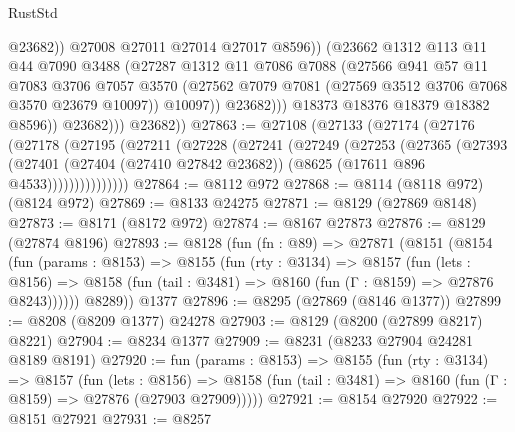 \begin{lexlean}{RustStd}
\begin{coremodule}
                              @23682))
                          @27008
                          @27011
                          @27014
                          @27017
                          @8596))
                      (@23662
                        @1312
                        @113
                        @11
                        @44
                        @7090
                        @3488
                        (@27287
                          @1312
                          @11
                          @7086
                          @7088
                          (@27566
                            @941
                            @57
                            @11
                            @7083
                            @3706
                            @7057
                            @3570
                            (@27562 @7079 @7081 (@27569 @3512 @3706 @7068 @3570 @23679 @10097))
                            @10097))
                        @23682)))
                  @18373
                  @18376
                  @18379
                  @18382
                  @8596))
              @23682)))
        @23682))
@27863 := @27108
    (@27133
      (@27174
        (@27176
          (@27178
            (@27195
              (@27211
                (@27228
                  (@27241
                    (@27249
                      (@27253
                        (@27365
                          (@27393
                            (@27401
                              (@27404 (@27410 @27842 @23682))
                              (@8625 (@17611 @896 @4533)))))))))))))))
@27864 := @8112 @972
@27868 := @8114 (@8118 @972) (@8124 @972)
@27869 := @8133 @24275
@27871 := @8129 (@27869 @8148)
@27873 := @8171 (@8172 @972)
@27874 := @8167 @27873
@27876 := @8129 (@27874 @8196)
@27893 := @8128
    (fun (fn : @89) =>
    @27871
      (@8151
        (@8154
          (fun (params : @8153) =>
          @8155
            (fun (rty : @3134) =>
            @8157
              (fun (lets : @8156) =>
              @8158 (fun (tail : @3481) => @8160 (fun (Γ : @8159) => @27876 @8243))))))
        @8289))
    @1377
@27896 := @8295 (@27869 (@8146 @1377))
@27899 := @8208 (@8209 @1377) @24278
@27903 := @8129 (@8200 (@27899 @8217) @8221)
@27904 := @8234 @1377
@27909 := @8231 (@8233 @27904 @24281 @8189 @8191)
@27920 := fun (params : @8153) =>
  @8155
    (fun (rty : @3134) =>
    @8157
      (fun (lets : @8156) =>
      @8158 (fun (tail : @3481) => @8160 (fun (Γ : @8159) => @27876 (@27903 @27909)))))
@27921 := @8154 @27920
@27922 := @8151 @27921
@27931 := @8257

\end{coremodule}
\end{lexlean}
